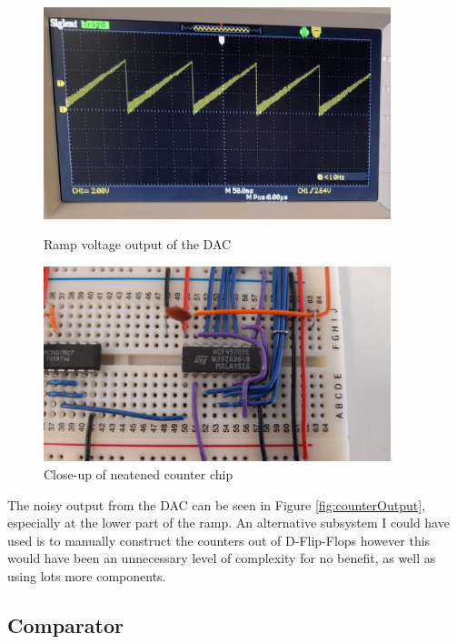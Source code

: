 \begin{figure}[H]
    \centering
    \begin{minipage}[t]{0.45\textwidth}
        \centering
        \includegraphics[width=0.9\textwidth]{images/counterOutputZoomed.jpg}
        \caption{Ramp voltage output of the DAC}
        \label{fig:counterOutput}
    \end{minipage}\hfill
    \begin{minipage}[t]{0.45\textwidth}
        \centering
        \includegraphics[width=0.9\textwidth]{images/counterNeatenedFinal.jpg}
        \caption{Close-up of neatened counter chip}
        \label{fig:counterCloseUpNeatened}
    \end{minipage}
\end{figure}
\noindent The noisy output from the DAC can be seen in Figure \ref{fig:counterOutput}, especially at the lower part of the ramp. \newline
An alternative subsystem I could have used is to manually construct the counters out of D-Flip-Flops however this would have been an unnecessary level of complexity for no benefit, as well as using lots more components.

\subsection{Comparator}
